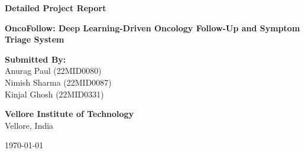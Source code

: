 \documentclass[12pt,a4paper]{report}
\begin{document}
\begin{titlepage}
    \begin{center}
        \vspace*{2cm}
        
        \Huge
        \textbf{Detailed Project Report}
        
        \vspace{1.5cm}
        \LARGE
        \textbf{OncoFollow: Deep Learning-Driven Oncology Follow-Up and Symptom Triage System}
        
        \vspace{2cm}
        
        \Large
        \textbf{Submitted By:}\\
        Anurag Paul (22MID0080)\\
        Nimish Sharma (22MID0087)\\
        Kinjal Ghosh (22MID0331)
        
        \vspace{3cm}
        
        \Large
        \textbf{Vellore Institute of Technology}\\
        Vellore, India
        
        \vspace{1.5cm}
        \large
        \today
        
    \end{center}
\end{titlepage}

\begin{abstract}
Post-treatment follow-up is critical for oncology patients to monitor symptoms, detect recurrences, and manage treatment side effects. Traditional follow-up methods rely on periodic clinical visits, which may delay the detection of urgent complications. This project proposes OncoFollow, a comprehensive web-based platform for breast cancer survivors that facilitates continuous monitoring and intelligent symptom triage. The system allows patients to report symptoms via structured forms or voice notes and upload medical documents (X-rays, CT scans, blood reports). An intelligent triage engine, guided by clinical oncology protocols (e.g., NCCN, ASCO), assesses symptom severity, identifies red-flag indicators, and determines urgency levels. Urgent cases trigger immediate alerts to the clinical team. The platform is developed using Next.js and incorporates strict clinical safety boundaries, demonstrating a scalable, explainable, and secure approach to digital oncology follow-up.
\end{abstract}
\end{document}
